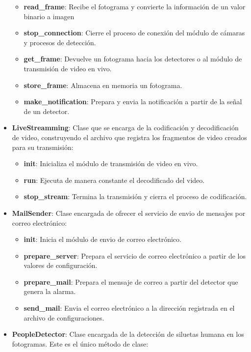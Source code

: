 \begin{itemize}
\begin{itemize}
            \item \textbf{read\_frame}: Recibe el fotograma y convierte la información de un valor binario a imagen
            \item \textbf{stop\_connection}: Cierre el proceso de conexión del módulo de cámaras y procesos de detección.
            \item \textbf{get\_frame}: Devuelve un fotograma hacia los detectores o al módulo de transmisión de video en vivo.
            \item \textbf{store\_frame}: Almacena en memoria un fotograma.
            \item \textbf{make\_notification}: Prepara y envia la notificación a partir de la señal de un detector.
        \end{itemize}
    \item \textbf{LiveStreamming}: Clase que se encarga de la codificación y decodificación de video, construyendo el archivo que registra los fragmentos de video creados para su transmisión:
        \begin{itemize}
            \item \textbf{init}: Inicializa el módulo de transmisión de video en vivo.
            \item \textbf{run}: Ejecuta de manera constante el decodificado del video.
            \item \textbf{stop\_stream}: Termina la transmisión y cierra el proceso de codificación.
        \end{itemize}
    \item \textbf{MailSender}: Clase encargada de ofrecer el servicio de envio de mensajes por correo electrónico:
        \begin{itemize}
            \item \textbf{init}: Inicia el módulo de envio de correo electrónico.
            \item \textbf{prepare\_server}: Prepara el servicio de correo electrónico a partir de los valores de configuración.
            \item \textbf{prepare\_mail}: Prepara el mensaje de correo a partir del detector que genera la alarma.
            \item \textbf{send\_mail}: Envia el correo electrónico a la dirección registrada en el archivo de configuraciones.
        \end{itemize}
    \item \textbf{PeopleDetector}: Clase encargada de la detección de siluetas humana en los fotogramas. Este es el único método de clase:

\end{itemize}
